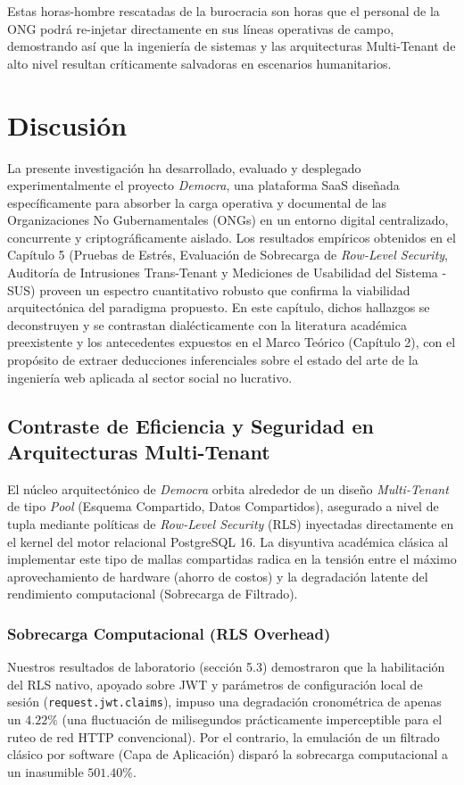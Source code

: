 \documentclass[11pt,a4paper,oneside]{report}
\begin{document}
Estas horas-hombre rescatadas de la burocracia son horas que el personal de la ONG podr\'a re-injetar directamente en sus l\'ineas operativas de campo, demostrando as\'i que la ingenier\'ia de sistemas y las arquitecturas Multi-Tenant de alto nivel resultan cr\'iticamente salvadoras en escenarios humanitarios.


\chapter{Discusi\'on}
\label{chapter:discusion}

La presente investigaci\'on ha desarrollado, evaluado y desplegado experimentalmente el proyecto \textit{Democra}, una plataforma SaaS dise\~nada espec\'ificamente para absorber la carga operativa y documental de las Organizaciones No Gubernamentales (ONGs) en un entorno digital centralizado, concurrente y criptogr\'aficamente aislado. Los resultados emp\'iricos obtenidos en el Cap\'itulo 5 (Pruebas de Estr\'es, Evaluaci\'on de Sobrecarga de \textit{Row-Level Security}, Auditor\'ia de Intrusiones Trans-Tenant y Mediciones de Usabilidad del Sistema - SUS) proveen un espectro cuantitativo robusto que confirma la viabilidad arquitect\'onica del paradigma propuesto. En este cap\'itulo, dichos hallazgos se deconstruyen y se contrastan dial\'ecticamente con la literatura acad\'emica preexistente y los antecedentes expuestos en el Marco Te\'orico (Cap\'itulo 2), con el prop\'osito de extraer deducciones inferenciales sobre el estado del arte de la ingenier\'ia web aplicada al sector social no lucrativo.

\section{Contraste de Eficiencia y Seguridad en Arquitecturas Multi-Tenant}

El n\'ucleo arquitect\'onico de \textit{Democra} orbita alrededor de un dise\~no \textit{Multi-Tenant} de tipo \textit{Pool} (Esquema Compartido, Datos Compartidos), asegurado a nivel de tupla mediante pol\'iticas de \textit{Row-Level Security} (RLS) inyectadas directamente en el kernel del motor relacional PostgreSQL 16. La disyuntiva acad\'emica cl\'asica al implementar este tipo de mallas compartidas radica en la tensi\'on entre el m\'aximo aprovechamiento de hardware (ahorro de costos) y la degradaci\'on latente del rendimiento computacional (Sobrecarga de Filtrado).

\subsection{Sobrecarga Computacional (RLS Overhead)}
Nuestros resultados de laboratorio (secci\'on 5.3) demostraron que la habilitaci\'on del RLS nativo, apoyado sobre JWT y par\'ametros de configuraci\'on local de sesi\'on (\texttt{request.jwt.claims}), impuso una degradaci\'on cronom\'etrica de apenas un $4.22\%$ (una fluctuaci\'on de milisegundos pr\'acticamente imperceptible para el ruteo de red HTTP convencional). Por el contrario, la emulaci\'on de un filtrado cl\'asico por software (Capa de Aplicaci\'on) dispar\'o la sobrecarga computacional a un inasumible $501.40\%$.
\end{document}
